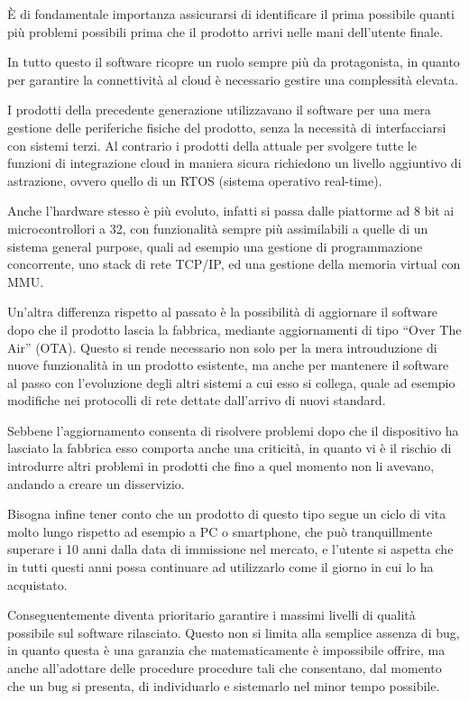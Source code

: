 \documentclass[12pt,a4paper,twoside,titlepage]{book}
\begin{document}
È di fondamentale importanza assicurarsi di identificare il prima possibile quanti
più problemi possibili prima che il prodotto arrivi nelle mani dell'utente finale.

In tutto questo il software ricopre un ruolo sempre più da protagonista, in quanto
per garantire la connettività al cloud è necessario gestire una complessità elevata.

I prodotti della precedente generazione utilizzavano il software per una mera gestione
delle periferiche fisiche del prodotto, senza la necessità di interfacciarsi con sistemi
terzi. Al contrario i prodotti della attuale per svolgere tutte le funzioni di
integrazione cloud in maniera sicura richiedono un livello aggiuntivo di astrazione,
ovvero quello di un RTOS (sistema operativo real-time).

Anche l'hardware stesso è più evoluto, infatti si passa dalle piattorme ad 8 bit ai
microcontrollori a 32, con funzionalità sempre più assimilabili a quelle di un sistema
general purpose, quali ad esempio una gestione di programmazione concorrente, uno
stack di rete TCP/IP, ed una gestione della memoria virtual con MMU.

Un'altra differenza rispetto al passato è la possibilità di aggiornare il software dopo
che il prodotto lascia la fabbrica, mediante aggiornamenti di tipo ``Over The Air'' (OTA).
Questo si rende necessario non solo per la mera introuduzione di nuove funzionalità in
un prodotto esistente, ma anche per mantenere il software al passo con l'evoluzione degli
altri sistemi a cui esso si collega, quale ad esempio modifiche nei protocolli di rete
dettate dall'arrivo di nuovi standard.

Sebbene l'aggiornamento consenta di risolvere problemi dopo che il dispositivo ha lasciato la
fabbrica esso comporta anche una criticità, in quanto vi è il rischio di introdurre altri problemi
in prodotti che fino a quel momento non li avevano, andando a creare un disservizio.

Bisogna infine tener conto che un prodotto di questo tipo segue un ciclo di vita molto lungo
rispetto ad esempio a PC o smartphone, che può tranquillmente superare i 10 anni dalla data di
immissione nel mercato, e l'utente si aspetta che in tutti questi anni possa continuare ad
utilizzarlo come il giorno in cui lo ha acquistato.

Conseguentemente diventa prioritario garantire i massimi livelli di qualità possibile
sul software rilasciato. Questo non si limita alla semplice assenza di bug, in quanto
questa è una garanzia che matematicamente è impossibile offrire, ma anche all'adottare
delle procedure procedure tali che consentano, dal momento che un bug si
presenta, di individuarlo e sistemarlo nel minor tempo possibile.
\end{document}
